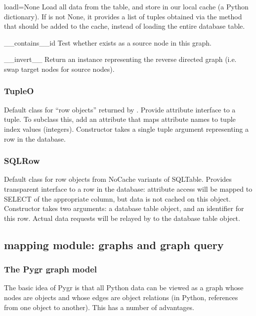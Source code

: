 \documentclass{howto}
\begin{document}
\begin{funcdesc}{load}{l=None}
  Load all data from the table, and store in our local cache (a
  Python dictionary).  If  is not None, it provides a
  list of tuples obtained via the  method that
  should be added to the cache, instead of loading the entire
  database table.
\end{funcdesc}

\begin{funcdesc}{__contains__}{id}
  Test whether  exists as a source node in this graph.
\end{funcdesc}

\begin{funcdesc}{__invert__}{}
  Return an  instance representing the reverse 
  directed graph (i.e. swap target nodes for source nodes).
\end{funcdesc}

\subsubsection{TupleO}
Default class for ``row objects'' returned by .
Provide attribute interface to a tuple.  To subclass this,
add an  attribute
that maps attribute names to tuple index values (integers).
Constructor takes a single tuple argument representing a
row in the database.

\subsubsection{SQLRow}
Default class for row objects from NoCache variants of SQLTable.
Provides transparent interface to a row in the database: attribute access
will be mapped to SELECT of the appropriate column, but data is not cached
on this object.  Constructor takes two arguments: a database table
object, and an identifier for this row.  Actual data requests will
be relayed by  to the database table object.


\subsection{mapping module: graphs and graph query}
\label{graphs-query}

\subsubsection{The Pygr graph model}
The basic idea of Pygr is that all Python data can be viewed as a graph whose nodes are objects and whose edges are object relations (in Python, references from one object to another).  This has a number of advantages. 
\end{document}
